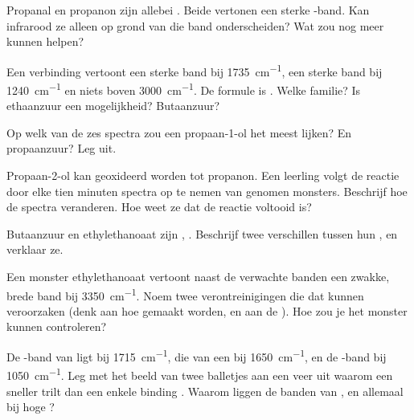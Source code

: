 \begin{exercise}[$\star\star$]\label{exo:g11:infrared:9}
Propanal en propanon zijn allebei . Beide vertonen een sterke
-band. Kan infrarood ze alleen op grond van die band
onderscheiden? Wat zou nog meer kunnen helpen?
\end{exercise}

\begin{exercise}[$\star\star$]\label{exo:g11:infrared:10}
Een verbinding vertoont een sterke band bij \qty{1735}{cm^{-1}}, een
sterke band bij \qty{1240}{cm^{-1}} en niets boven \qty{3000}{cm^{-1}}.
De formule is . Welke familie? Is ethaanzuur een
mogelijkheid? Butaanzuur?
\end{exercise}

\begin{exercise}[$\star\star$]\label{exo:g11:infrared:11}
Op welk van de zes spectra zou een  propaan-1-ol het meest lijken?
En propaanzuur? Leg uit.
\end{exercise}

\begin{exercise}[$\star\star\star$]\label{exo:g11:infrared:12}
Propaan-2-ol kan geoxideerd worden tot propanon. Een leerling volgt de
reactie door elke tien minuten spectra op te nemen van genomen monsters.
Beschrijf hoe de spectra veranderen. Hoe weet ze dat de reactie
voltooid is?
\end{exercise}

\begin{exercise}[$\star\star\star$]\label{exo:g11:infrared:13}
Butaanzuur en ethylethanoaat zijn , . Beschrijf twee
verschillen tussen hun , en verklaar ze.
\end{exercise}

\begin{exercise}[$\star\star\star$]\label{exo:g11:infrared:14}
Een monster ethylethanoaat vertoont naast de verwachte banden een zwakke,
brede band bij \qty{3350}{cm^{-1}}. Noem twee verontreinigingen die dat
kunnen veroorzaken (denk aan hoe  gemaakt worden, en aan de ).
Hoe zou je het monster kunnen controleren?
\end{exercise}

\begin{exercise}[$\star\star\star$]\label{exo:g11:infrared:15}
De -band van  ligt bij \qty{1715}{cm^{-1}}, die van een
 bij \qty{1650}{cm^{-1}}, en de -band bij
\qty{1050}{cm^{-1}}. Leg met het beeld van twee balletjes aan een veer uit
waarom een   sneller trilt dan een enkele binding
. Waarom liggen de banden van ,  en 
allemaal bij hoge ?
\end{exercise}

